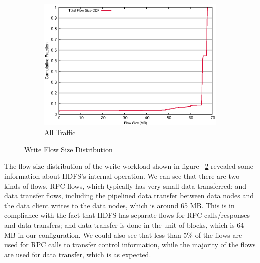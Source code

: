 \begin{figure}[!htpb]
\begin{subfigure}[b]{.55\linewidth}
	\includegraphics[width=.99\textwidth]{figures/6writes/flow_size.eps}
	\caption{All Traffic}\label{fig:write_size:all}
   \end{subfigure}%
\caption{Write Flow Size Distribution}
\label{fig:write_size}
\end{figure}


The flow size distribution of the write workload shown in figure ~\ref{fig:write_size} revealed some information about HDFS's internal operation. We can see that there are two kinds of flows, RPC flows, which typically has very small data transferred; and data transfer flows, including the pipelined data transfer between data nodes and the data client writes to the data nodes, which is around 65 MB. This is in compliance with the fact that HDFS has separate flows for RPC calls/responses and data transfers; and data transfer is done in the unit of blocks, which is 64 MB in our configuration. We could also see that less than 5\% of the flows are used for RPC calls to transfer control information, while the majority of the flows are used for data transfer, which is as expected. 

